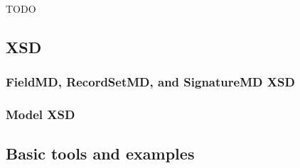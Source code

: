 \documentclass[10pt]{article}
\begin{document}
\ifHOLD
TODO

\subsection{XSD}

\subsubsection{FieldMD, RecordSetMD, and SignatureMD XSD}

\subsubsection{Model XSD}

\subsection{Basic tools and examples}

\fi









\vfill
\strut
\clearpage

\printindex
\end{document}
